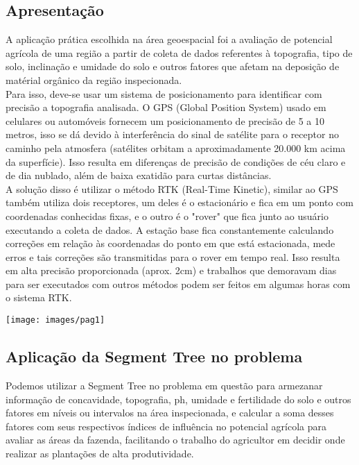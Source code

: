 \documentclass{article}
\begin{document}
\subsection{Apresentação}
\leavevmode
\indent A aplicação prática escolhida na área geoespacial foi a avaliação de potencial agrícola de uma região a partir de coleta de dados referentes à topografia, tipo de solo, inclinação e umidade do solo e outros fatores que afetam na deposição de matérial orgânico da região inspecionada. \\
\indent Para isso, deve-se usar um sistema de posicionamento para identificar com precisão a topografia analisada. O GPS (Global Position System) usado em celulares ou automóveis fornecem um posicionamento de precisão de 5 a 10 metros, isso se dá devido à interferência do sinal de satélite para o receptor no caminho pela atmosfera (satélites orbitam a aproximadamente 20.000 km acima da superfície). Isso resulta em diferenças de precisão de condições de céu claro e de dia nublado, além de baixa exatidão para curtas distâncias. \\
\indent A solução disso é utilizar o método RTK (Real-Time Kinetic), similar ao GPS também utiliza dois receptores, um deles é o estacionário e fica em um ponto com coordenadas conhecidas fixas, e o outro é o "rover" que fica junto ao usuário executando a coleta de dados. A estação base fica constantemente calculando correções em relação às coordenadas do ponto em que está estacionada, mede erros e tais correções são transmitidas para o rover em tempo real. Isso resulta em alta precisão proporcionada (aprox. 2cm) e trabalhos que demoravam dias para ser executados com outros métodos podem ser feitos em algumas horas com o sistema RTK. \\

\indent

\texttt{[image: images/pag1]} \\

\subsection{Aplicação da Segment Tree no problema}
\leavevmode
\indent Podemos utilizar a Segment Tree no problema em questão para armezanar informação de concavidade, topografia, ph, umidade e fertilidade do solo e outros fatores em níveis ou intervalos na área inspecionada, e calcular a soma desses fatores com seus respectivos índices de influência no potencial agrícola para avaliar as áreas da fazenda, facilitando o trabalho do agricultor em decidir onde realizar as plantações de alta produtividade. \\
\indent
\end{document}
